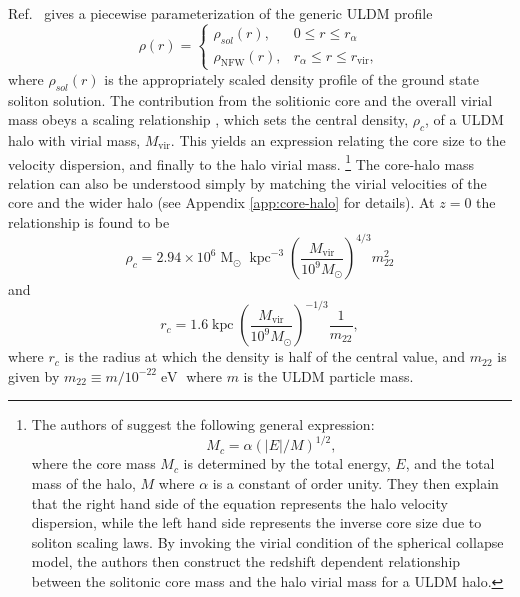 \documentclass[a4paper,11pt]{article}
\begin{document}
 
Ref.~\cite{Robles:2018fur} gives a piecewise parameterization of the generic ULDM profile 
%
\begin{equation}\label{eq:piecewise}
     \rho(r)=
    \begin{cases}
      \rho_{sol}(r), & 0\leq r \leq r_{\alpha} \\
      \rho_\mathrm{NFW}(r), & r_{\alpha}\leq r \leq r_{\mathrm{vir}},
    \end{cases}
\end{equation}
%
where $\rho_{sol}(r)$ is the appropriately scaled density profile of the ground state soliton solution. The contribution from the solitionic core and the overall virial mass  obeys a scaling relationship \cite{Schive:2014hza}, which sets the  central density, $\rho_c$, of a ULDM halo with virial mass, $M_{\mathrm{vir}}$.  This yields an expression relating the core size to the velocity dispersion, and finally to the halo virial mass.%
\footnote{The authors of \cite{Schive:2014hza} suggest the following general expression:
\begin{equation}
    M_c = \alpha \left(\vert E\vert/M\right)^{1/2},
\end{equation}
where the core mass $M_c$ is determined by the total energy, $E$, and the total mass of the halo, $M$ where $\alpha$ is a constant of order unity. They then explain that the right hand side of the equation represents the halo velocity dispersion, while the left hand side  represents the inverse core size due to soliton scaling laws. By invoking the virial condition of the spherical collapse model, the authors then  construct the redshift dependent relationship between the solitonic core mass and the halo virial mass for a ULDM halo.}
%
The core-halo mass relation can also be understood simply by matching the virial velocities of the core and the wider halo (see Appendix \ref{app:core-halo} for details). 
At $z=0$ the relationship is found to be \cite{Schive:2014hza} 
%
\begin{equation}\label{eq:central_dens}
    \rho_c = 2.94\times10^6 \operatorname{M}_{\odot}\operatorname{kpc}^{-3}\left(\frac{M_{\mathrm{vir}}}{10^9 M_{\odot}}\right)^{4/3}m_{22}^{2}
\end{equation}
and 
\begin{equation}
    r_c = 1.6 \operatorname{kpc}\left(\frac{M_{\mathrm{vir}}}{10^9 M_{\odot}}\right)^{-1/3}\frac{1}{m_{22}},
\end{equation}
%
where $r_c$ is the radius at which the density is half of the central value, and $m_{22}$ is given by $m_{22} \equiv m / 10^{-22} \operatorname{eV}$ where $m$ is the ULDM particle mass. 
\end{document}
